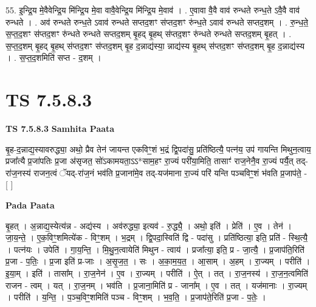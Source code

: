 \documentclass[17pt]{extarticle}
\begin{document}
55. इ॒न्द्रि॒य मे॒वैवेन्द्रि॒य मि॑न्द्रि॒य मे॒वा वावै॒वेन्द्रि॒य मि॑न्द्रि॒य मे॒वाव॑ । . ए॒वावा वै॒वै वाव॑ रुन्धते रुन्ध॒ते ऽवै॒वै वाव॑ रुन्धते । . अव॑ रुन्धते रुन्ध॒ते ऽवाव॑ रुन्धते सप्तद॒शꣳ स॑प्तद॒शꣳ रु॑न्ध॒ते ऽवाव॑ रुन्धते सप्तद॒शम् । . रु॒न्ध॒ते॒ स॒प्त॒द॒शꣳ स॑प्तद॒शꣳ रु॑न्धते रुन्धते सप्तद॒शम् बृ॒हद् बृ॒हथ् स॑प्तद॒शꣳ रु॑न्धते रुन्धते सप्तद॒शम् बृ॒हत् । . स॒प्त॒द॒शम् बृ॒हद् बृ॒हथ् स॑प्तद॒शꣳ स॑प्तद॒शम् बृ॒ह द॒न्नाद्य॑स्या॒ न्नाद्य॑स्य बृ॒हथ् स॑प्तद॒शꣳ स॑प्तद॒शम् बृ॒ह द॒न्नाद्य॑स्य । . स॒प्त॒द॒शमिति॑ सप्त - द॒शम् । \newline
\pagebreak
{}

\section{ TS 7.5.8.3 }

\textbf{TS 7.5.8.3 } \newline
\textbf{Samhita Paata} \newline

बृ॒ह-द॒न्नाद्य॒स्यावरुद्ध्या॒ अथो॒ प्रैव तेन॑ जायन्त एकविꣳ॒॒शं भ॒द्रं द्वि॒पदा॑सु॒ प्रति॑ष्ठित्यै॒ पत्न॑य॒ उप॑ गायन्ति मिथुन॒त्वाय॒ प्रजा᳚त्यै प्र॒जा॑पतिः प्र॒जा अ॑सृजत॒ सो॑ऽकामयता॒ऽऽ*साम॒हꣳ रा॒ज्यं परी॑या॒मिति॒ तासाꣳ॑ राज॒नेनै॒व रा॒ज्यं पर्यै॒त् तद्-रा॑ज॒नस्य॑ राजन॒त्वं ॅयद्-रा॑ज॒नं भव॑ति प्र॒जाना॑मे॒व तद्-यज॑माना रा॒ज्यं परि॑ यन्ति पञ्चविꣳ॒॒शं भ॑वति प्र॒जाप॑ते॒ - [  ] \newline

\textbf{Pada Paata} \newline

बृ॒हत् । अ॒न्नाद्य॒स्येत्य॑न्न - अद्य॑स्य । अव॑रुद्ध्या॒ इत्यव॑ - रु॒द्ध्यै॒ । अथो॒ इति॑ । प्रेति॑ । ए॒व । तेन॑ । जा॒य॒न्ते॒ । ए॒क॒विꣳ॒॒शमित्ये॑क - विꣳ॒॒शम् । भ॒द्रम् । द्वि॒पदा॒स्विति॑ द्वि - पदा॑सु । प्रति॑ष्ठित्या॒ इति॒ प्रति॑ - स्थि॒त्यै॒ । पत्न॑यः । उपेति॑ । गा॒य॒न्ति॒ । मि॒थु॒न॒त्वायेति॑ मिथुन - त्वाय॑ । प्रजा᳚त्या॒ इति॒ प्र - जा॒त्यै॒ । प्र॒जाप॑ति॒रिति॑ प्र॒जा - प॒तिः॒ । प्र॒जा इति॑ प्र-जाः । अ॒सृ॒ज॒त॒ । सः । अ॒का॒म॒य॒त॒ । आ॒साम् । अ॒हम् । रा॒ज्यम् । परीति॑ । इ॒या॒म् । इति॑ । तासा᳚म् । रा॒ज॒नेन॑ । ए॒व । रा॒ज्यम् । परीति॑ । ऐ॒त् । तत् । रा॒ज॒नस्य॑ । रा॒ज॒न॒त्वमिति॑ राजन - त्वम् । यत् । रा॒ज॒नम् । भव॑ति । प्र॒जाना॒मिति॑ प्र - जाना᳚म् । ए॒व । तत् । यज॑मानाः । रा॒ज्यम् । परीति॑ । य॒न्ति॒ । प॒ञ्च॒विꣳ॒॒शमिति॑ पञ्च - विꣳ॒॒शम् । भ॒व॒ति॒ । प्र॒जाप॑ते॒रिति॑ प्र॒जा - प॒तेः॒ ।  \newline
\end{document}

